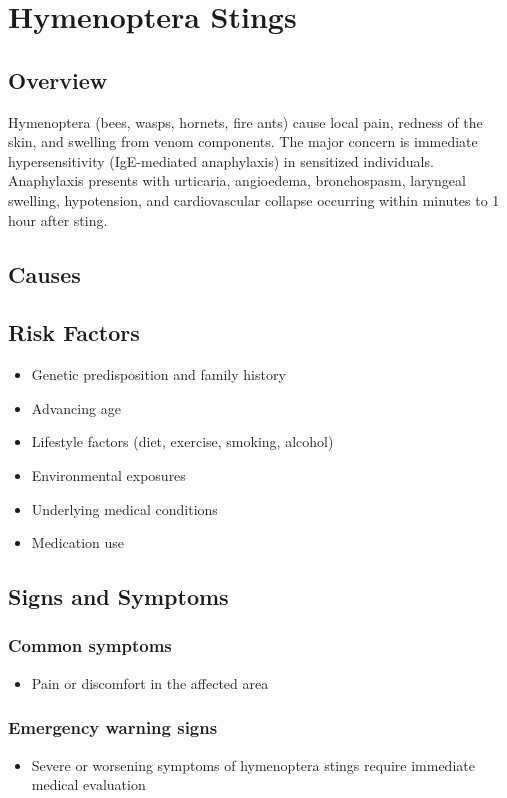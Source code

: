 \chapter{Hymenoptera Stings}
\label{sec:Hymenoptera Stings}

\section{Overview}
Hymenoptera (bees, wasps, hornets, fire ants) cause local pain, redness of the skin, and swelling from venom components. The major concern is immediate hypersensitivity (IgE-mediated anaphylaxis) in sensitized individuals. Anaphylaxis presents with urticaria, angioedema, bronchospasm, laryngeal swelling, hypotension, and cardiovascular collapse occurring within minutes to 1 hour after sting.
\section{Causes}
\section{Risk Factors}

\begin{itemize}[noitemsep]
  \item Genetic predisposition and family history
  \item Advancing age
  \item Lifestyle factors (diet, exercise, smoking, alcohol)
  \item Environmental exposures
  \item Underlying medical conditions
  \item Medication use
\end{itemize}
\section{Signs and Symptoms}

\subsection{Common symptoms}
\begin{itemize}[noitemsep]
  \item Pain or discomfort in the affected area
  \end{itemize}

\subsection{Emergency warning signs}
\begin{itemize}[noitemsep]
  \item Severe or worsening symptoms of hymenoptera stings require immediate medical evaluation
\end{itemize}
